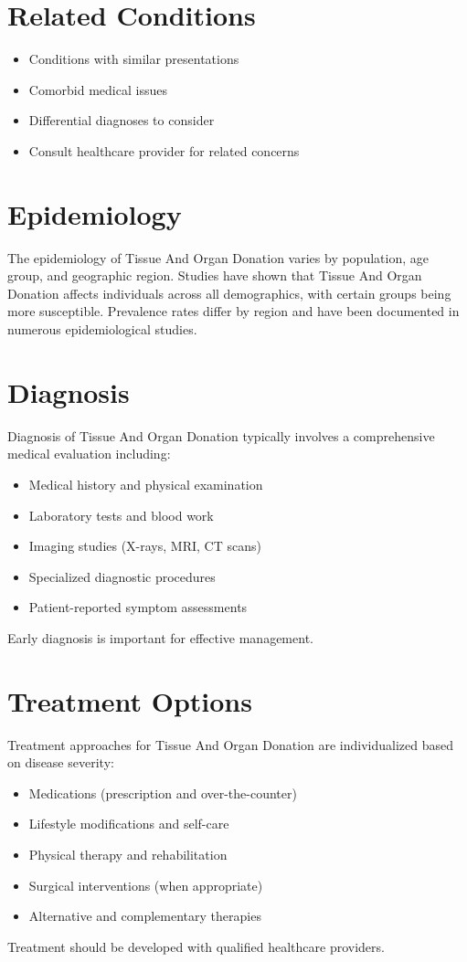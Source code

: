 \section*{Related Conditions}
\begin{itemize}
  \item Conditions with similar presentations
  \item Comorbid medical issues
  \item Differential diagnoses to consider
  \item Consult healthcare provider for related concerns
\end{itemize}

\section*{Epidemiology}
The epidemiology of Tissue And Organ Donation varies by population, age group, and geographic region. Studies have shown that Tissue And Organ Donation affects individuals across all demographics, with certain groups being more susceptible. Prevalence rates differ by region and have been documented in numerous epidemiological studies.

\section*{Diagnosis}
Diagnosis of Tissue And Organ Donation typically involves a comprehensive medical evaluation including:
\begin{itemize}
  \item Medical history and physical examination
  \item Laboratory tests and blood work
  \item Imaging studies (X-rays, MRI, CT scans)
  \item Specialized diagnostic procedures
  \item Patient-reported symptom assessments
\end{itemize}
Early diagnosis is important for effective management.

\section*{Treatment Options}
Treatment approaches for Tissue And Organ Donation are individualized based on disease severity:
\begin{itemize}
  \item Medications (prescription and over-the-counter)
  \item Lifestyle modifications and self-care
  \item Physical therapy and rehabilitation
  \item Surgical interventions (when appropriate)
  \item Alternative and complementary therapies
\end{itemize}
Treatment should be developed with qualified healthcare providers.


